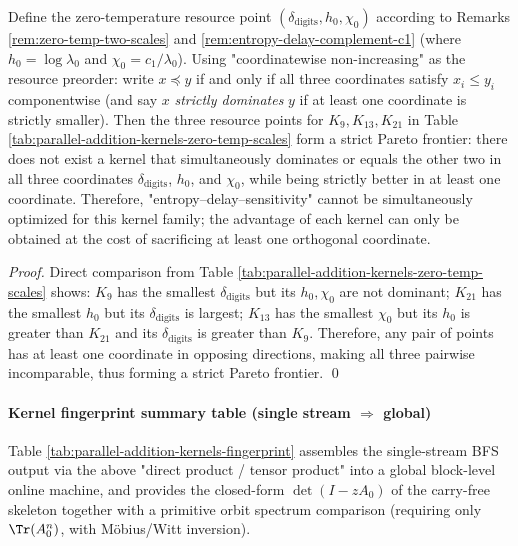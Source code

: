 \begin{corollary}\label{cor:parallel-addition-zero-temp-pareto-frontier}
Define the zero-temperature resource point
\(
(\delta_{\mathrm{digits}},h_0,\chi_0)
\)
according to Remarks \ref{rem:zero-temp-two-scales} and \ref{rem:entropy-delay-complement-c1} (where \(h_0=\log\lambda_0\) and \(\chi_0=c_1/\lambda_0\)).
Using "coordinatewise non-increasing" as the resource preorder: write \(x\preceq y\) if and only if all three coordinates satisfy \(x_i\le y_i\) componentwise (and say \(x\) \emph{strictly dominates} \(y\) if at least one coordinate is strictly smaller).
Then the three resource points for \(K_9,K_{13},K_{21}\) in Table \ref{tab:parallel-addition-kernels-zero-temp-scales} form a strict Pareto frontier: there does not exist a kernel that simultaneously dominates or equals the other two in all three coordinates \(\delta_{\mathrm{digits}}\), \(h_0\), and \(\chi_0\), while being strictly better in at least one coordinate.
Therefore, "entropy--delay--sensitivity" cannot be simultaneously optimized for this kernel family; the advantage of each kernel can only be obtained at the cost of sacrificing at least one orthogonal coordinate.
\end{corollary}
\begin{proof}
Direct comparison from Table \ref{tab:parallel-addition-kernels-zero-temp-scales} shows: \(K_9\) has the smallest \(\delta_{\mathrm{digits}}\) but its \(h_0,\chi_0\) are not dominant; \(K_{21}\) has the smallest \(h_0\) but its \(\delta_{\mathrm{digits}}\) is largest; \(K_{13}\) has the smallest \(\chi_0\) but its \(h_0\) is greater than \(K_{21}\) and its \(\delta_{\mathrm{digits}}\) is greater than \(K_9\).
Therefore, any pair of points has at least one coordinate in opposing directions, making all three pairwise incomparable, thus forming a strict Pareto frontier. \qed
\end{proof}

\paragraph{Kernel fingerprint summary table (single stream $\Rightarrow$ global)}
Table \ref{tab:parallel-addition-kernels-fingerprint} assembles the single-stream BFS output via the above "direct product / tensor product" into a global block-level online machine, and provides the closed-form $\det(I-zA_0)$ of the carry-free skeleton together with a primitive orbit spectrum comparison (requiring only $\Tr(A_0^n)$, with M\"obius/Witt inversion).


